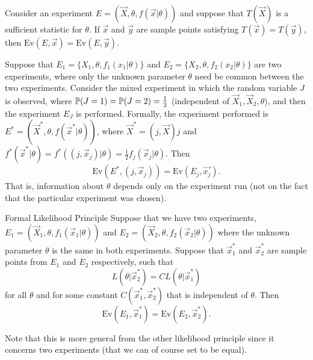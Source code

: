 \begin{definition}
    Consider an experiment $E = (\vec{X}, \theta, f(\vec{x}\vert{}\theta))$ and suppose that $T(\vec{X})$ is a sufficient statistic for $\theta$. If $\vec{x}$ and $\vec{y}$ are sample points satisfying $T(\vec{x}) = T(\vec{y})$, then $\text{Ev}(E, \vec{x}) = \text{Ev}(E, \vec{y})$.
\end{definition}

\begin{definition}
    Suppose that $E_1 = \{X_1, \theta, f_1(x_1\vert{} \theta)\}$ and $E_2 = \{X_2, \theta, f_2(x_2\vert{} \theta)\}$ are two experiments, where only the unknown parameter $\theta$ need be common between the two experiments. Consider the mixed experiment in which the random variable $J$ is observed, where $\P{}(J = 1) = \P{}(J = 2) = \frac12$ (independent of $\vec{X}_1, \vec{X}_2, \theta$), and then the experiment $E_J$ is performed. Formally, the experiment performed is $E^* = (\vec{X}^*, \theta, f(\vec{x}^* \vert{} \theta))$, where $\vec{X}^* = (j, \vec{X})j$ and $f^*(\vec{x}^* \vert{} \theta) = f^*((j, \vec{x}_j)\vert{} \theta) = \frac12 f_j(\vec{x}_j \vert{}\theta)$. Then
    \[
        \text{Ev}(E^*, (j, \vec{x}_j)) = \text{Ev}(E_j, \vec{x_j}).
    \]
    That is, information about $\theta$ depends only on the experiment run (not on the fact that the particular experiment was chosen).
\end{definition}

\begin{definition}{Formal Likelihood Principle}
    Suppose that we have two experiments, $E_1 = (\vec{X}_1, \theta, f_1(\vec{x}_1 \vert{} \theta))$ and $E_2 = (\vec{X}_2, \theta, f_2(\vec{x}_2 \vert{} \theta))$ where the unknown parameter $\theta$ is the same in both experiments. Suppose that $\vec{x}_1^*$ and $\vec{x}_2^*$ are sample points from $E_1$ and $E_2$ respectively, such that 
    \[
        L(\theta \vert{} \vec{x}_2^*) = CL(\theta \vert{} \vec{x}_1^*)
    \]
    for all $\theta$ and for some constant $C(\vec{x}_1^*, \vec{x}_2^*)$ that is independent of $\theta$. Then
    \[
        \text{Ev}(E_1, \vec{x}_1^*) = \text{Ev}(E_2, \vec{x}_2^*).
    \]
\end{definition}

\begin{remark}
    Note that this is more general from the other likelihood principle since it concerns two experiments (that we can of course set to be equal).
\end{remark}

